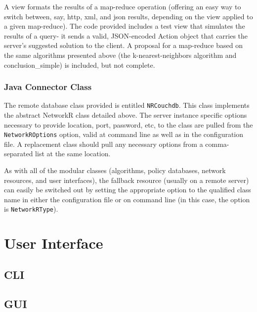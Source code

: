 A view formats the results of a map-reduce operation (offering an easy way to switch between, say, http, xml, and json results, depending on the view applied to a given map-reduce).
The code provided includes a test view that simulates the results of a query- it sends a valid, JSON-encoded Action object that carries the server's suggested solution to the client. A proposal for a map-reduce based on the same algorithms presented above (the k-nearest-neighbors algorithm and conclusion\_simple) is included, but not complete.


\subsubsection{Java Connector Class}
The remote database class provided is entitled \texttt{NRCouchdb}. This class implements the abstract NetworkR class detailed above. The server instance specific options necessary to provide location, port, password, etc, to the class are pulled from the \texttt{NetworkROptions} option, valid at command line as well as in the configuration file. A replacement class should pull any necessary options from a comma-separated list at the same location.

As with all of the modular classes (algorithms, policy databases, network resources, and user interfaces), the fallback resource (usually on a remote server) can easily be switched out by setting the appropriate  option to the qualified class name in either the configuration file or on command line (in this case, the option is \texttt{NetworkRType}).

\section{User Interface} %


\subsection{CLI}%




\subsection{GUI}%

